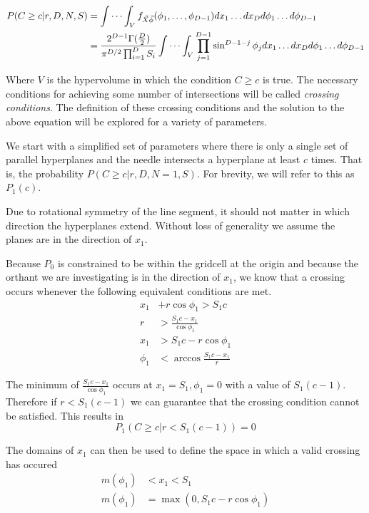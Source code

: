 \documentclass{article}
\begin{document}
\begin{align} 
	P(C\ge c|r, D, N, S)&=\idotsint_V f_{\vec{X}\vec\phi}(\phi_1,\hdots,\phi_{D-1})dx_1 \hdots dx_D d\phi_1 \hdots d\phi_{D-1}\\
	&= \frac{2^{D-1}\Gamma(\frac{D}{2})}{\pi^{D/2}\prod_{i=1}^DS_i} \idotsint_V \prod_{j=1}^{D-1}\sin^{D-1-j}\phi_j dx_1\hdots dx_D d\phi_1 \hdots d\phi_{D-1} \label{eq:volume integral}
\end{align}

Where $V$ is the hypervolume in which the condition $C\ge c$ is true. The necessary conditions for achieving some number of intersections
will be called \emph{crossing conditions}. The definition of these crossing conditions and the solution to the above equation will be
explored for a variety of parameters.

We start with a simplified set of parameters where there is only a single set of parallel hyperplanes and the needle intersects a
hyperplane at least $c$ times. That is, the probability $P(C\ge c | r, D, N=1, S)$. For brevity, we will refer to this as $P_1(c)$.

Due to rotational symmetry of the line segment, it should not matter in which direction the hyperplanes extend. Without loss of
generality we assume the planes are in the direction of $x_1$.

Because $P_0$ is constrained to be within the gridcell at the origin and because the orthant we are investigating is in the direction
of $x_1$, we know that a crossing occurs whenever the following equivalent conditions are met.
\begin{align}
	x_1 &+ r\cos{\phi_1} > S_1c\\
	r &> \frac{S_1c - x_1}{\cos{\phi_1}} \\
	x_1 &> S_1c - r\cos{\phi_1} \\
	\phi_1 &< \arccos{\frac{S_1c-x_1}{r}}
\end{align}

The minimum of $\frac{S_1c - x_1}{\cos{\phi_1}}$ occurs at $x_1=S_1, \phi_1=0$ with a value of $S_1(c-1)$. Therefore if $r<S_1(c-1)$ we can guarantee that the crossing condition
cannot be satisfied. This results in
\begin{equation}
	P_1(C\ge c|r<S_1(c-1)) = 0
\end{equation}

The domains of $x_1$ can then be used to define the space in which a valid crossing has occured 
\begin{align} 
	m(\phi_1) &< x_1 < S_1 \\ \label{eq:crossing condition 0}
	m(\phi_1) &= \max(0, S_1c-r\cos{\phi_1}) 
\end{align}
\end{document}
